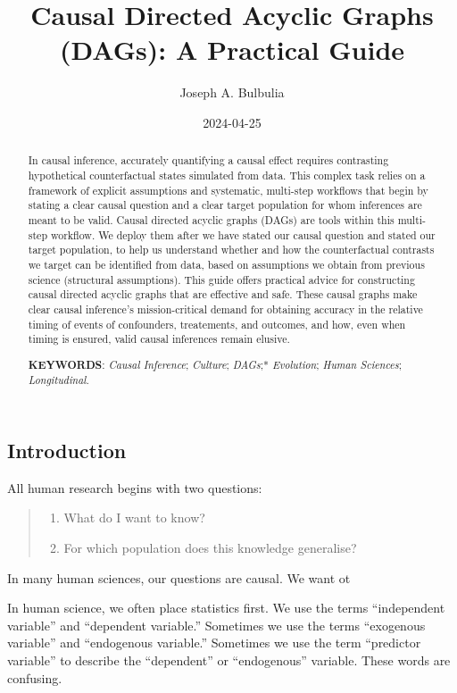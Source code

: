 \documentclass[
  single column]{article}
\title{Causal Directed Acyclic Graphs (DAGs): A Practical Guide}
\author{Joseph A. Bulbulia}
\affil{%
             \small{     Victoria University of Wellington, New Zealand
          ORCID \textcolor[HTML]{A6CE39}{\aiOrcid} ~0000-0002-5861-2056 }
              }
\date{2024-04-25}
\providecommand{\tightlist}{%
  \setlength{\itemsep}{0pt}\setlength{\parskip}{0pt}}\usepackage{longtable,booktabs,array}
\begin{document}
\maketitle
\begin{abstract}
In causal inference, accurately quantifying a causal effect requires
contrasting hypothetical counterfactual states simulated from data. This
complex task relies on a framework of explicit assumptions and
systematic, multi-step workflows that begin by stating a clear causal
question and a clear target population for whom inferences are meant to
be valid. Causal directed acyclic graphs (DAGs) are tools within this
multi-step workflow. We deploy them after we have stated our causal
question and stated our target population, to help us understand whether
and how the counterfactual contrasts we target can be identified from
data, based on assumptions we obtain from previous science (structural
assumptions). This guide offers practical advice for constructing causal
directed acyclic graphs that are effective and safe. These causal graphs
make clear causal inference's mission-critical demand for obtaining
accuracy in the relative timing of events of confounders, treatements,
and outcomes, and how, even when timing is ensured, valid causal
inferences remain elusive.

\textbf{KEYWORDS}: \emph{Causal Inference}; \emph{Culture};
\emph{DAGs};* \emph{Evolution}; \emph{Human Sciences};
\emph{Longitudinal}.
\end{abstract}

\subsection{Introduction}\label{introduction}

All human research begins with two questions:

\begin{quote}
\begin{enumerate}
\def\labelenumi{\arabic{enumi}.}
\tightlist
\item
  What do I want to know?
\item
  For which population does this knowledge generalise?
\end{enumerate}
\end{quote}

In many human sciences, our questions are causal. We want ot

In human science, we often place statistics first. We use the terms
``independent variable'' and ``dependent variable.'' Sometimes we use
the terms ``exogenous variable'' and ``endogenous variable.'' Sometimes
we use the term ``predictor variable'' to describe the ``dependent'' or
``endogenous'' variable. These words are confusing.
\end{document}
